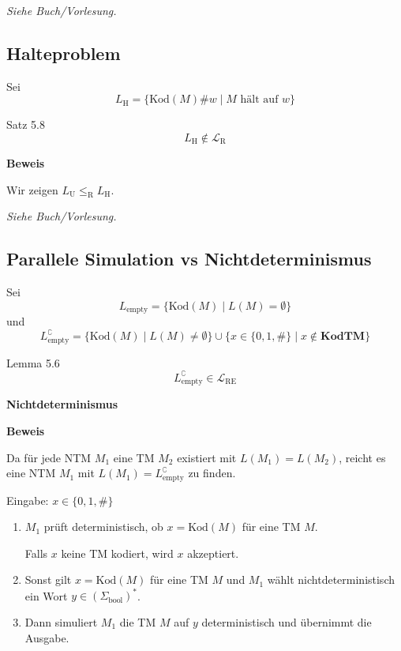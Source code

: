 \documentclass[a4paper, 11pt]{article}
\def\Lre{\mathcal{L}_\text{RE}}
\def\Lr{\mathcal{L}_\text{R}}
\newcommand\myTitle[1]{{\large \textbf {#1}}}
\begin{document}
                    \textit{Siehe Buch/Vorlesung.}
                    \subsection{Halteproblem}
                    Sei $$L_{\text{H}} = \{\text{Kod}(M)\#w \mid M \text{ hält auf }w\}$$
                    \begin{mainbox}{Satz 5.8}
                        $$L_{\text{H}} \notin \Lr$$
                    \end{mainbox}
                    \textbf{Beweis}
                
                    Wir zeigen $L_{\text{U}} \leq_{\text{R}} L_{\text{H}}$.
                
                    \textit{Siehe Buch/Vorlesung.}
                
                
                
                
                
                    \subsection{Parallele Simulation vs Nichtdeterminismus}
                    Sei 
                    $$L_{\text{empty}} = \{\text{Kod}(M) \mid L(M) = \emptyset\}$$
                    und 
                    $$L_{\text{empty}}^\complement = \{\text{Kod}(M) \mid L(M) \neq \emptyset\} \cup \{x \in \{0,1, \#\}\mid x \notin \textbf{KodTM}\}$$
                    \begin{mainbox}{Lemma 5.6}
                        $$L_{\text{empty}}^\complement \in \Lre$$
                    \end{mainbox}
                
                
                
                    \myTitle{Nichtdeterminismus}

                    \textbf{Beweis}
                
                    Da für jede NTM $M_1$ eine TM $M_2$ existiert mit $L(M_1) = L(M_2)$, reicht es eine NTM $M_1$ mit $L(M_1) = L_{\text{empty}}^\complement$ zu finden.
                
                    Eingabe: $x \in \{0,1,\#\}$
                    \begin{enumerate}[label=(\roman*)]
                        \item $M_1$ prüft deterministisch, ob $x = \text{Kod}(M)$ für eine TM $M$. 
                        
                        Falls $x$ keine TM kodiert, wird $x$ akzeptiert.
                        
                        \item Sonst gilt $x = \text{Kod}(M)$ für eine TM $M$ und $M_1$ wählt nichtdeterministisch ein Wort $y \in (\Sigma_{\text{bool}})^*$. 
                        
                        \item Dann simuliert $M_1$ die TM $M$ auf $y$ deterministisch und übernimmt die Ausgabe. 
                    \end{enumerate} 
                
\end{document}
